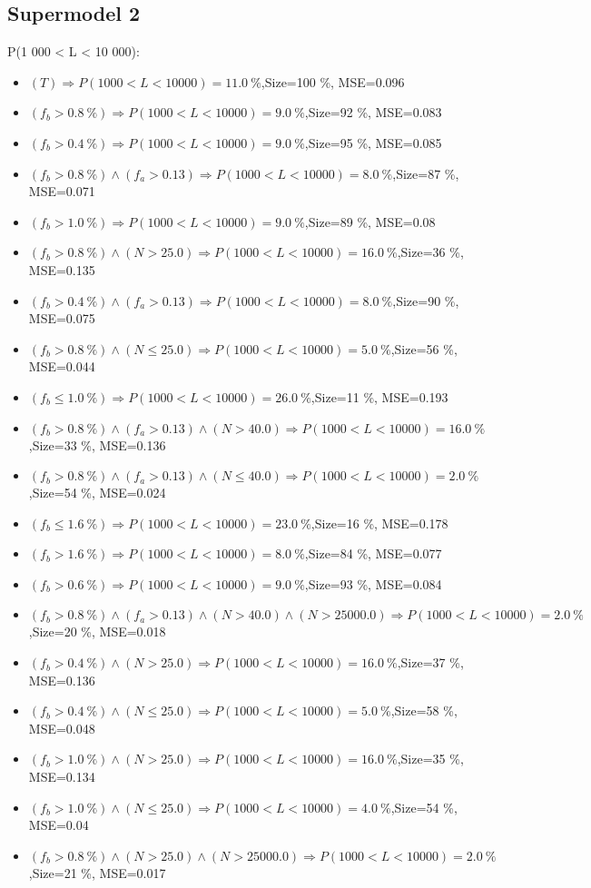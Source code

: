 \documentclass[numbered]{CSL}
\begin{document}
\subsection{Supermodel 2}
P(1 000 < L < 10 000):
\begin{itemize}
\item $(T) \Rightarrow P(1 000 < L < 10 000) = 11.0~\%$,\hfill Size=100 \%, MSE=0.096
\item $(f_b > 0.8~\%) \Rightarrow P(1 000 < L < 10 000) = 9.0~\%$,\hfill Size=92 \%, MSE=0.083
\item $(f_b > 0.4~\%) \Rightarrow P(1 000 < L < 10 000) = 9.0~\%$,\hfill Size=95 \%, MSE=0.085
\item $(f_b > 0.8~\%) \land (f_a > 0.13) \Rightarrow P(1 000 < L < 10 000) = 8.0~\%$,\hfill Size=87 \%, MSE=0.071
\item $(f_b > 1.0~\%) \Rightarrow P(1 000 < L < 10 000) = 9.0~\%$,\hfill Size=89 \%, MSE=0.08
\item $(f_b > 0.8~\%) \land (N > 25.0) \Rightarrow P(1 000 < L < 10 000) = 16.0~\%$,\hfill Size=36 \%, MSE=0.135
\item $(f_b > 0.4~\%) \land (f_a > 0.13) \Rightarrow P(1 000 < L < 10 000) = 8.0~\%$,\hfill Size=90 \%, MSE=0.075
\item $(f_b > 0.8~\%) \land (N \leq 25.0) \Rightarrow P(1 000 < L < 10 000) = 5.0~\%$,\hfill Size=56 \%, MSE=0.044
\item $(f_b \leq 1.0~\%) \Rightarrow P(1 000 < L < 10 000) = 26.0~\%$,\hfill Size=11 \%, MSE=0.193
\item $(f_b > 0.8~\%) \land (f_a > 0.13) \land (N > 40.0) \Rightarrow P(1 000 < L < 10 000) = 16.0~\%$,\hfill Size=33 \%, MSE=0.136
\item $(f_b > 0.8~\%) \land (f_a > 0.13) \land (N \leq 40.0) \Rightarrow P(1 000 < L < 10 000) = 2.0~\%$,\hfill Size=54 \%, MSE=0.024
\item $(f_b \leq 1.6~\%) \Rightarrow P(1 000 < L < 10 000) = 23.0~\%$,\hfill Size=16 \%, MSE=0.178
\item $(f_b > 1.6~\%) \Rightarrow P(1 000 < L < 10 000) = 8.0~\%$,\hfill Size=84 \%, MSE=0.077
\item $(f_b > 0.6~\%) \Rightarrow P(1 000 < L < 10 000) = 9.0~\%$,\hfill Size=93 \%, MSE=0.084
\item $(f_b > 0.8~\%) \land (f_a > 0.13) \land (N > 40.0) \land (N > 25000.0) \Rightarrow P(1 000 < L < 10 000) = 2.0~\%$,\hfill Size=20 \%, MSE=0.018
\item $(f_b > 0.4~\%) \land (N > 25.0) \Rightarrow P(1 000 < L < 10 000) = 16.0~\%$,\hfill Size=37 \%, MSE=0.136
\item $(f_b > 0.4~\%) \land (N \leq 25.0) \Rightarrow P(1 000 < L < 10 000) = 5.0~\%$,\hfill Size=58 \%, MSE=0.048
\item $(f_b > 1.0~\%) \land (N > 25.0) \Rightarrow P(1 000 < L < 10 000) = 16.0~\%$,\hfill Size=35 \%, MSE=0.134
\item $(f_b > 1.0~\%) \land (N \leq 25.0) \Rightarrow P(1 000 < L < 10 000) = 4.0~\%$,\hfill Size=54 \%, MSE=0.04
\item $(f_b > 0.8~\%) \land (N > 25.0) \land (N > 25000.0) \Rightarrow P(1 000 < L < 10 000) = 2.0~\%$,\hfill Size=21 \%, MSE=0.017
\end{itemize}
\end{document}
